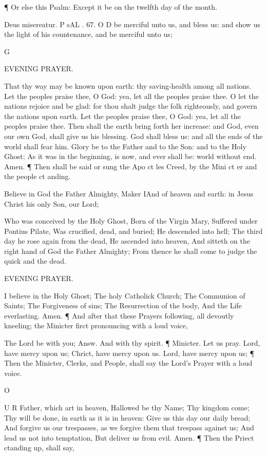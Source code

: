 ¶ Or else this Psalm: Except it be on the twelfth day of the month.

Deus misereatur. P sAL . 67. O D be merciful unto us, and bless us: and show us the light of his countenance, and be merciful unto us;

G

EVENING PRAYER.

That thy way may be known upon earth: thy saving-health among all nations. Let the peoples praise thee, O God: yea, let all the peoples praise thee. O let the nations rejoice and be glad: for thou shalt judge the folk righteously, and govern the nations upon earth. Let the peoples praise thee, O God: yea, let all the peoples praise thee. Then shall the earth bring forth her increase: and God, even our own God, shall give us his blessing. God shall bless us: and all the ends of the world shall fear him. Glory be to the Father and to the Son: and to the Holy Ghost; As it was in the beginning, is now, and ever shall be: world without end. Amen. ¶ Then shall be said or sung the Apo ct les Creed, by the Mini ct er and the people ct anding.

Believe in God the Father Almighty, Maker IAnd of heaven and earth: in Jesus Christ his only Son, our Lord;

Who was conceived by the Holy Ghost, Born of the Virgin Mary, Suffered under Pontius Pilate, Was crucified, dead, and buried; He descended into hell; The third day he rose again from the dead, He ascended into heaven, And sitteth on the right hand of God the Father Almighty; From thence he shall come to judge the quick and the dead.

EVENING PRAYER.

I believe in the Holy Ghost; The holy Catholick Church; The Communion of Saints; The Forgiveness of sins; The Resurrection of the body, And the Life everlasting. Amen. ¶ And after that these Prayers following, all devoutly kneeling; the Minicter firct pronouncing with a loud voice,

The Lord be with you; Answ. And with thy spirit. ¶ Minicter. Let us pray. Lord, have mercy upon us; Chrict, have mercy upon us. Lord, have mercy upon us; ¶ Then the Minicter, Clerks, and People, shall say the Lord’s Prayer with a loud voice.

O

U R Father, which art in heaven, Hallowed be thy Name; Thy kingdom come; Thy will be done, in earth as it is in heaven: Give us this day our daily bread; And forgive us our trespasses, as we forgive them that trespass against us; And lead us not into temptation, But deliver us from evil. Amen. ¶ Then the Priect ctanding up, shall say,

